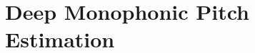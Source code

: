 
\graphicspath{{4-monophonic/figures/}}

\chapter{Deep Monophonic Pitch Estimation}
\label{ch:monophonic}
